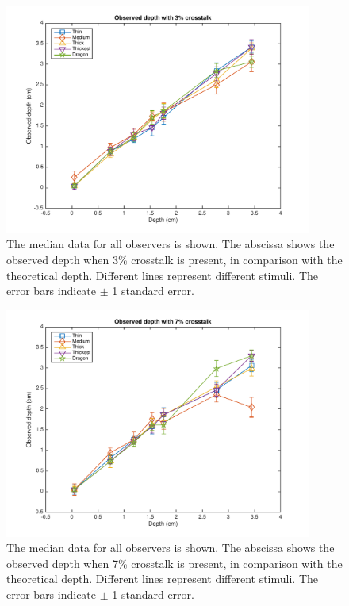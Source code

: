 \begin{figure}[H]
\centering
    \includegraphics[width=0.9\textwidth]{./Template_Figures/a_crosstalk_3}
    \caption{The median data for all observers is shown. The abscissa shows the observed depth when 3\% crosstalk is present, in comparison with the theoretical depth. Different lines represent different stimuli. The error bars indicate $\pm$ 1 standard error.\label{fig:a_crosstalk_3}}
\end{figure}

\begin{figure}[H]
\centering
    \includegraphics[width=0.9\textwidth]{./Template_Figures/a_crosstalk_7}
    \caption{The median data for all observers is shown. The abscissa shows the observed depth when 7\% crosstalk is present, in comparison with the theoretical depth. Different lines represent different stimuli. The error bars indicate $\pm$ 1 standard error.\label{fig:a_crosstalk_7}}
\end{figure}

